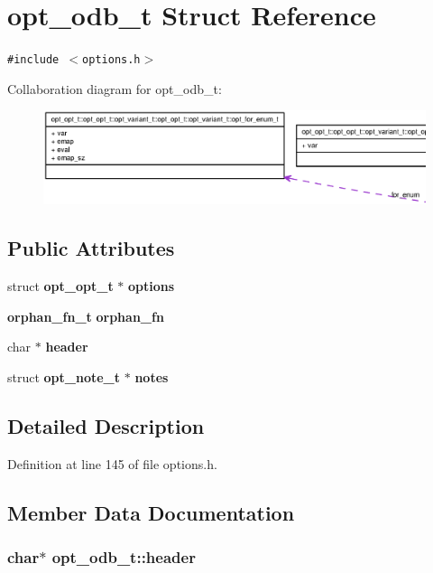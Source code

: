 \section{opt\_\-odb\_\-t Struct Reference}
\label{structopt__odb__t}
{\tt \#include $<$options.h$>$}

Collaboration diagram for opt\_\-odb\_\-t:\nopagebreak
\begin{figure}[H]
\begin{center}
\leavevmode
\includegraphics[width=400pt]{structopt__odb__t__coll__graph}
\end{center}
\end{figure}
\subsection*{Public Attributes}
\begin{CompactItemize}
\item 
struct {\bf opt\_\-opt\_\-t} $\ast$ {\bf options}
\item 
{\bf orphan\_\-fn\_\-t} {\bf orphan\_\-fn}
\item 
char $\ast$ {\bf header}
\item 
struct {\bf opt\_\-note\_\-t} $\ast$ {\bf notes}
\end{CompactItemize}


\subsection{Detailed Description}


Definition at line 145 of file options.h.

\subsection{Member Data Documentation}
\subsubsection[{header}]{\setlength{\rightskip}{0pt plus 5cm}char$\ast$ {\bf opt\_\-odb\_\-t::header}}\label{structopt__odb__t_e82dc6f49f12511d85b52d20cc2d82f4}




